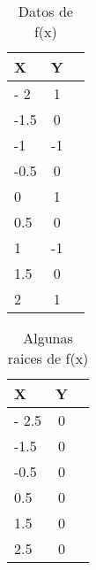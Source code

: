 \begin{table}[!ht]
\begin{center}
\begin{tabular}{|l|c|c|} \hline 

 X    &  Y \\ \hline
- 2   &  1 \\ \hline
 -1.5 &  0 \\ \hline
 -1   & -1 \\ \hline
 -0.5 &  0 \\ \hline
  0   &  1 \\ \hline
  0.5 &  0 \\ \hline
  1   & -1 \\ \hline
  1.5 &  0 \\ \hline
  2   &  1 \\ \hline
  
\end{tabular}
\end{center}
\caption{Datos de f(x)}
\label{tab:1}
\end{table}

\begin{table}[!ht]
\begin{center}
\begin{tabular}{|l|c|c|}
\hline
 X    &  Y \\ \hline
- 2.5 &  0 \\ \hline
 -1.5 &  0 \\ \hline
 -0.5 &  0 \\ \hline
  0.5 &  0 \\ \hline
  1.5 &  0 \\ \hline
  2.5 &  0 \\ \hline
\end{tabular}
\end{center}
\caption{Algunas raices de f(x)}
\label{tab}
\end{table}

